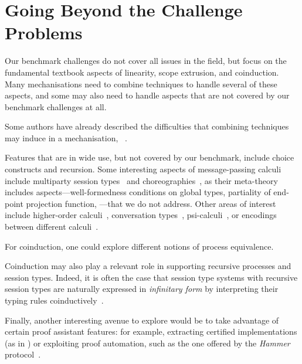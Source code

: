 \documentclass[runningheads]{llncs}
\begin{document}
\section{Going Beyond the Challenge Problems}\label{sec:going-beyond}
Our benchmark challenges do not cover all issues in the field, but focus on the fundamental textbook aspects of linearity, scope extrusion, and coinduction.
Many mechanisations need to combine techniques to handle several of these aspects, and some may also need to handle aspects that are not covered by our benchmark challenges at all.

Some authors have already described the difficulties that combining techniques may induce in a mechanisation, \eg~\cite{DBLP:conf/forte/ZalakainD21}.

Features that are in wide use, but not covered by our benchmark, include choice constructs and recursion.
Some interesting aspects of message-passing calculi include multiparty session types~\cite{10.1145/2827695} and choreographies~\cite{Carbone2013}, as their meta-theory includes aspects---\eg well-formedness conditions on global types, partiality of end-point projection function, \etc---that we do not address.
Other areas of interest include higher-order calculi~\cite{Hirsch2022}, conversation types~\cite{DBLP:journals/tcs/CairesV10}, psi-calculi~\cite{lmcs:696}, or encodings between different calculi~\cite{DBLP:journals/iandc/Gorla10,DBLP:journals/iandc/DardhaGS17}.

For coinduction, one could explore different notions of process equivalence.

Coinduction may also play a relevant role in supporting recursive processes and session types.
Indeed, it is often the case that session type systems with recursive session types are naturally expressed in \emph{infinitary form} by interpreting their typing rules
coinductively~\cite{DerakhshanPfenning22,HornePadovani23}.

Finally, another interesting avenue to explore would be to take
advantage of certain proof assistant features: for example, extracting
certified implementations (as in \cite{Castro-Perez2021}) or exploiting
proof automation, such as the one offered by the \emph{Hammer}
protocol~\cite{BohmeN10,CzajkaK18}.
\end{document}
